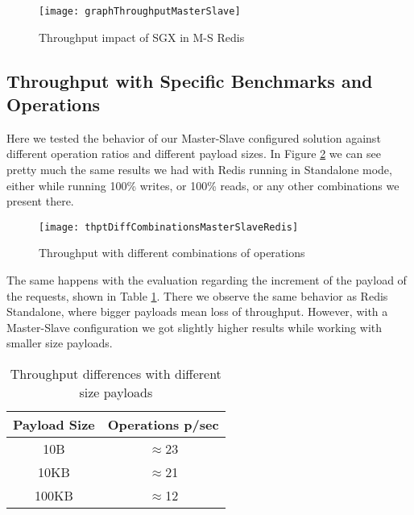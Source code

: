 \begin{figure}[htbp]
	\centering
	{\texttt{[image: graphThroughputMasterSlave]}}
	\caption{Throughput impact of SGX in M-S Redis}
	\label{fig:graphTroughputMasterSlave}
\end{figure}

\subsection{Throughput with Specific Benchmarks and Operations}

Here we tested the behavior of our Master-Slave configured solution against different operation ratios and different payload sizes. 
In Figure \ref{fig:thptDiffCombinationsMasterSlaveRedis} we can see pretty much the same results we had with Redis running in Standalone mode, either while running 100\% writes, or 100\% reads, or any other combinations we present there.  

\begin{figure}[htbp]
	\centering
	{\texttt{[image: thptDiffCombinationsMasterSlaveRedis]}}
	\caption{Throughput with different combinations of operations}
	\label{fig:thptDiffCombinationsMasterSlaveRedis}
\end{figure}

The same happens with the evaluation regarding the increment of the payload of the requests, shown in Table \ref{table:throughputPayloadsMS}. There we observe the same behavior as Redis Standalone, where bigger payloads mean loss of throughput. However, with a Master-Slave configuration we got slightly higher results while working with smaller size payloads.

\begin{table}[ht]
	\caption{Throughput differences with different size payloads} %
	\centering %
	\begin{tabular}{c c} %
		\hline\hline %
		\textbf{Payload Size} & \textbf{Operations p/sec}\\ [0.5ex] %
		\hline
		10B & $\approx$23\\
		\hline
		10KB & $\approx$21\\
		\hline %
		100KB & $\approx$12\\ [1ex] %
		\hline %
	\end{tabular}
	\label{table:throughputPayloadsMS} %
\end{table} 


